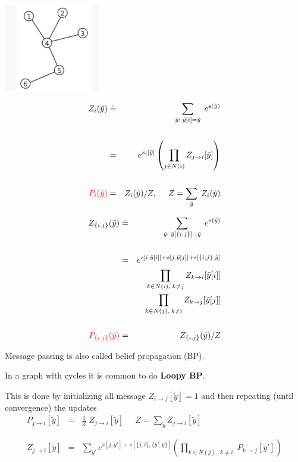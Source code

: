 {

\centerline{\includegraphics[height=1.5in]{../images/Tree}}

\begin{eqnarray*}
Z_i(\tilde{y}) & \doteq & \sum_{\hat{y}:\; \hat{y}[i] = \tilde{y}} \;e^{s(\hat{y})} \\
\\
& = & e^{s_i[\tilde{y}]} \left(\prod_{j\in N(i)} Z_{j \rightarrow i}[\tilde{y}]\right) \\
\\
{\color{red} P_i(\tilde{y})} & = & Z_i(\tilde{y})/Z,\;\;\;\;\; Z = \sum_{\tilde{y}}\;Z_i(\tilde{y})
\end{eqnarray*}



\begin{eqnarray*}
Z_{\{i,j\}}(\tilde{y}) & \doteq & \sum_{\hat{y}:\; \hat{y}[\{i,j\}] = \tilde{y}} \;e^{s(\hat{y})} \\
\\
& = & e^{s[i,\tilde{y}[i]] + s[j,\tilde{y}[j]] +s[\{i,j\},\tilde{y}]} \\
& & \prod_{k\in N(i),\;k \not = j} Z_{k \rightarrow i}[\tilde{y}[i]] \\
& & \prod_{k\in N(j),\;k \not = i} Z_{k \rightarrow j}[\tilde{y}[j]] \\
\\
{\color{red} P_{\{i,j\}}(\tilde{y})} & = & Z_{\{i,j\}}(\tilde{y})/Z
\end{eqnarray*}


Message passing is also called belief propagation (BP).

\vfill
In a graph with cycles it is common to do {\bf Loopy BP}.

\vfill
This is done by initializing all message $Z_{i \rightarrow j}[\tilde{y}] = 1$ and then repeating (until convergence) the updates
\vfill
\begin{eqnarray*}
  P_{j \rightarrow i}[\tilde{y}] & = & \frac{1}{Z}\;Z_{j \rightarrow i}[\tilde{y}] \;\;\;\;\;Z = \sum_{\tilde{y}} Z_{j \rightarrow i}[\tilde{y}] \\
  \\
  \\
  Z_{j\rightarrow i}[\tilde{y}] & = & \sum_{\tilde{y}'}  e^{s[j,\tilde{y}'] + s[\{j,i\},\{\tilde{y}',\tilde{y}\}]}
    \left(\prod_{k \in N(j),\;k \not = i}\;P_{k\rightarrow j}[\tilde{y}']\right)
\end{eqnarray*}

}
